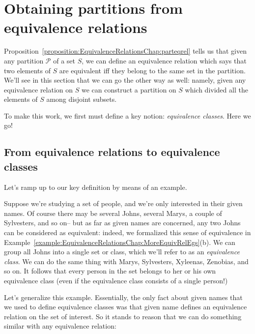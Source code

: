 \section{Obtaining partitions from equivalence relations\quad{}} \label{sec:EquivalenceRelations:ObtainingPartitions}

Proposition~\ref{proposition:EquivalenceRelationsChap:parteqrel} tells us that given any partition $\mathcal{P}$ of a set $S$, we can define an equivalence relation which says that two elements of $S$ are equivalent iff they belong to the same set in the partition. We'll see in this section that we can go the other way as well: namely, given any equivalence relation on $S$ we can construct a partition on $S$ which divided all the elements of $S$ among disjoint subsets.

To make this work, we first must define a key notion: \emph{equivalence classes}. Here we go!

 \subsection{From equivalence relations to equivalence classes}

Let's ramp up to our key definition by means of  an example. 

\begin{example}{}
Suppose we're studying a set of people, and we're only interested in their given names.  Of course there may be several Johns, several Marys, a couple of Sylvesters, and so on-- but  as far as given names are concerned, any two Johns can be considered as equivalent: indeed, we formalized this sense of equivalence in Example~\ref{example:EquivalenceRelationsChap:MoreEquivRelEgs}(b). We can group all Johns into a single set or class, which we'll refer to as an  \emph{equivalence class}. We can do the same thing with Marys, Sylvesters, Xyleenas, Zenobias, and so on. It follows that every person in the set belongs to her or his own equivalence class (even if the equivalence class consists of a single person!)
\end{example}

Let's generalize this example. Essentially, the only fact about given names that we used to define equivalence classes was that given name defines an equivalence relation on the set of interest. So it stands to reason that we can do something similar with any equivalence relation:
 

